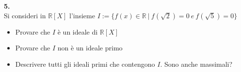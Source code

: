 \documentclass[italian,a4paper,11pt]
{article}
\newcommand{\R}{\mathbb{R}}
\newcommand{\acc}{\`}
\begin{document}
\vspace{0.4 cm}
\noindent
\begin{Ex}\textbf{ 5.}\\
Si consideri in $\R[X]$ l'insieme $I:=\{f(x)\in \R \ | \ f(\sqrt2)=0 \ e \ f(\sqrt5)=0\}$
\begin{itemize}
\item Provare che $I$ \acc e un ideale di $\R[X]$
\item Provare che $I$ non \acc e un ideale primo
\item Descrivere tutti gli ideali primi che contengono $I$. Sono anche massimali?
\end{itemize}

\end{Ex}
\end{document}
